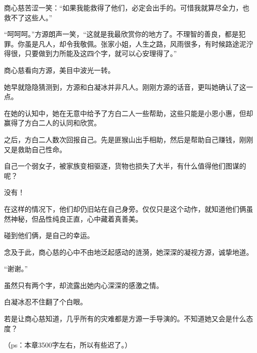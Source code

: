 \begin{this_body}
商心慈苦涩一笑：“如果我能救得了他们，必定会出手的。可惜我就算尽全力，也救不了这些人。”

“呵呵呵。”方源朗声一笑，“这就是我最欣赏你的地方了。不理智的善良，都是犯罪。你虽是凡人，却令我敬佩。张家小姐，人生之路，风雨很多，有时候路途泥泞得很，只要做到力所能及这四个字，就可以心安理得了。”

商心慈看向方源，美目中波光一转。

她早就隐隐猜测到，方源和白凝冰并非凡人。刚刚方源的话音，更叫她确认了这一点。

在她的认知中，她在无意中给予了方白二人一些帮助，这些只能是小恩小惠，但却赢得了方白二人的认同和欣赏。

之后，方白二人数次回报自己。先是匪猴山出手相助，然后是帮助自己赚钱，刚刚又是救助自己性命。

自己一个弱女子，被家族变相驱逐，货物也损失了大半，有什么值得他们图谋的呢？

没有！

在这样的情况下，他们却仍旧站在自己身旁。仅仅只是这个动作，就知道他们俩虽然神秘，但品性纯良正直，心中藏着真善美。

碰到他们俩，是自己的幸运。

念及于此，商心慈的心中不由地泛起感动的涟漪，她深深的凝视方源，诚挚地道。

“谢谢。”

虽然只有两个字，却流露出她内心深深的感激之情。

白凝冰忍不住翻了个白眼。

若是让商心慈知道，几乎所有的灾难都是方源一手导演的。不知道她又会是什么态度？

（ps：本章3500字左右，所以有些迟了。）

\end{this_body}

